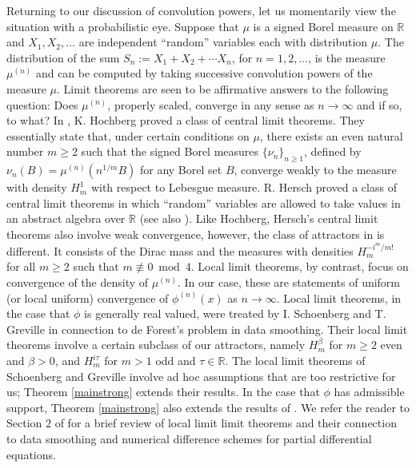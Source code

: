 \documentclass{article}
\theoremstyle{theorem}
\theoremstyle{remark}
\begin{document}
\noindent Returning to our discussion of convolution powers, let us momentarily view the situation with a probabilistic eye. Suppose that $\mu$ is a signed Borel measure on $\mathbb{R}$ and $X_1,X_2,\dots$ are independent ``random'' variables each with distribution $\mu$. The distribution of the sum $S_n:=X_1+X_2+\cdots X_n$, for $n=1,2,\dots$, is the measure $\mu^{(n)}$ and can be computed by taking successive convolution powers of the measure $\mu$. Limit theorems are seen to be affirmative answers to the following question: Does $\mu^{(n)}$, properly scaled, converge in any sense as $n\rightarrow \infty$ and if so, to what? In \cite{Hochberg1978,Hochberg1980}, K. Hochberg proved a class of central limit theorems. They essentially state that, under certain conditions on $\mu$, there exists an even natural number $m\geq 2$ such that the signed Borel measures $\{\nu_n\}_{n\geq 1}$, defined by $\nu_n(B)=\mu^{(n)}(n^{1/m}B)$ for any Borel set $B$, converge weakly to the measure with density $H_m^1$ with 
respect to Lebesgue measure. R. Hersch \cite{RH} proved a class of central limit theorems in which ``random'' variables are allowed to take values in an abstract algebra over $\mathbb{R}$  (see also \cite{Zhukov1959}). Like Hochberg, Hersch's central limit theorems also involve weak convergence, however, the class of attractors in \cite{RH} is different. It consists of the Dirac mass and the measures with densities $H_m^{-i^m/m!}$ for all $m\geq 2$ such that $m\not\equiv 0\bmod 4$. Local limit theorems, by contrast, focus on convergence of the density of $\mu^{(n)}$. In our case, these are statements of uniform (or local uniform) convergence of $\phi^{(n)}(x)$ as $n\rightarrow\infty$. Local limit theorems, in the case that $\phi$ is generally real valued, were treated by I. Schoenberg \cite{IJS} and T. Greville \cite{TNEG} in connection to de Forest's problem in data smoothing. Their local limit theorems involve a certain subclass of our attractors, namely $H_m^{\beta}$ for $m\geq 2$ even and $\beta>0$, and 
$H_m^{i\tau}$ for $m>1$ odd and $\tau\in\mathbb{R}$. The local limit theorems of Schoenberg and Greville involve ad hoc assumptions that are too restrictive for us; Theorem \ref{mainstrong} extends their results. In the case that $\phi$ has admissible support, Theorem \ref{mainstrong} also extends the results of \cite{DSC1}. We refer the reader to Section $2$ of \cite{DSC1} for a brief review of local limit limit theorems and their connection to data smoothing and numerical difference schemes for partial differential equations.\\
\end{document}
